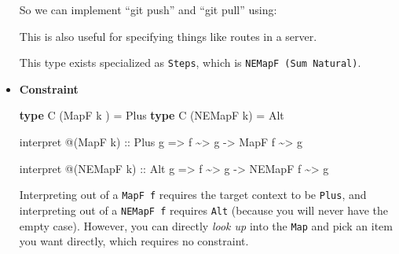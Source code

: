 \documentclass[]{article}
\newenvironment{Shaded}{}{}
\newcommand{\DataTypeTok}[1]{\textcolor[rgb]{0.56,0.13,0.00}{#1}}
\newcommand{\KeywordTok}[1]{\textcolor[rgb]{0.00,0.44,0.13}{\textbf{#1}}}
\newcommand{\NormalTok}[1]{#1}
\newcommand{\OperatorTok}[1]{\textcolor[rgb]{0.40,0.40,0.40}{#1}}
\newcommand{\OtherTok}[1]{\textcolor[rgb]{0.00,0.44,0.13}{#1}}
\newcommand{\StringTok}[1]{\textcolor[rgb]{0.25,0.44,0.63}{#1}}
\begin{document}
\begin{itemize}
  So we can implement ``git push'' and ``git pull'' using:

\begin{Shaded}
\end{Shaded}

  This is also useful for specifying things like routes in a server.

  This type exists specialized as \texttt{Steps}, which is
  \texttt{NEMapF\ (Sum\ Natural)}.
\item
  \textbf{Constraint}

\begin{Shaded}
\begin{Highlighting}[]
\KeywordTok{type} \DataTypeTok{C}\NormalTok{ (}\DataTypeTok{MapF}\NormalTok{ k  ) }\OtherTok{=} \DataTypeTok{Plus}
\KeywordTok{type} \DataTypeTok{C}\NormalTok{ (}\DataTypeTok{NEMapF}\NormalTok{ k) }\OtherTok{=} \DataTypeTok{Alt}

\NormalTok{interpret }\OperatorTok{@}\NormalTok{(}\DataTypeTok{MapF}\NormalTok{ k)}
\OtherTok{    ::} \DataTypeTok{Plus}\NormalTok{ g}
    \OtherTok{=>}\NormalTok{ f }\OperatorTok{\textasciitilde{}>}\NormalTok{ g}
    \OtherTok{{-}>} \DataTypeTok{MapF}\NormalTok{ f }\OperatorTok{\textasciitilde{}>}\NormalTok{ g}

\NormalTok{interpret }\OperatorTok{@}\NormalTok{(}\DataTypeTok{NEMapF}\NormalTok{ k)}
\OtherTok{    ::} \DataTypeTok{Alt}\NormalTok{ g}
    \OtherTok{=>}\NormalTok{ f }\OperatorTok{\textasciitilde{}>}\NormalTok{ g}
    \OtherTok{{-}>} \DataTypeTok{NEMapF}\NormalTok{ f }\OperatorTok{\textasciitilde{}>}\NormalTok{ g}
\end{Highlighting}
\end{Shaded}

  Interpreting out of a \texttt{MapF\ f} requires the target context to be
  \texttt{Plus}, and interpreting out of a \texttt{NEMapF\ f} requires
  \texttt{Alt} (because you will never have the empty case). However, you can
  directly \emph{look up} into the \texttt{Map} and pick an item you want
  directly, which requires no constraint.
\end{itemize}
\end{document}
